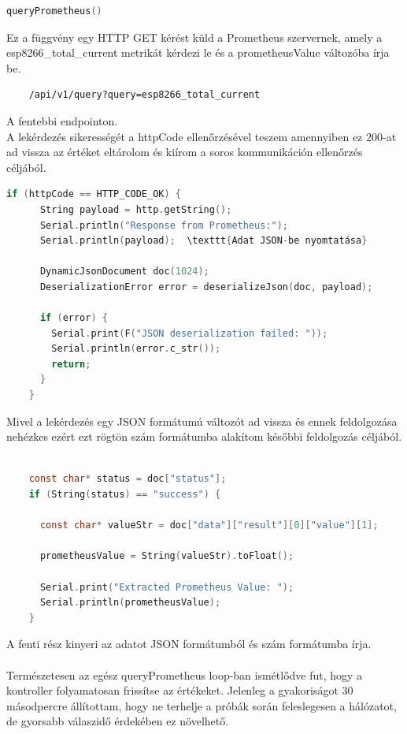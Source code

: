 \begin{lstlisting}[language=C]
    queryPrometheus()
\end{lstlisting}

Ez a függvény egy HTTP GET kérést küld a Prometheus szervernek, amely a esp8266\_total\_current 
metrikát kérdezi le és a prometheusValue változóba írja be.

\begin{lstlisting}
    /api/v1/query?query=esp8266_total_current
\end{lstlisting}

A fentebbi endpointon. \\
A lekérdezés sikerességét a httpCode ellenőrzésével teszem amennyiben ez 200-at ad vissza az értéket eltárolom 
és kiírom a soros kommunikáción ellenőrzés céljából.

\begin{lstlisting}[language=C]
    if (httpCode == HTTP_CODE_OK) {
      String payload = http.getString();
      Serial.println("Response from Prometheus:");
      Serial.println(payload);  \texttt{Adat JSON-be nyomtatása}

      DynamicJsonDocument doc(1024);
      DeserializationError error = deserializeJson(doc, payload);

      if (error) {
        Serial.print(F("JSON deserialization failed: "));
        Serial.println(error.c_str());
        return;
      }
    }
\end{lstlisting}

Mivel a lekérdezés egy JSON formátumú változót ad vissza és ennek feldolgozása nehézkes ezért ezt rögtön szám 
formátumba alakítom későbbi feldolgozás céljából.

\begin{lstlisting}[language=C]
    
    const char* status = doc["status"];
    if (String(status) == "success") {
      
      const char* valueStr = doc["data"]["result"][0]["value"][1];
      
      prometheusValue = String(valueStr).toFloat();

      Serial.print("Extracted Prometheus Value: ");
      Serial.println(prometheusValue);
    }
\end{lstlisting}

A fenti rész kinyeri az adatot JSON formátumból és szám formátumba írja.\\
\\
Természetesen az egész queryPrometheus loop-ban ismétlődve fut, hogy a kontroller folyamatosan frissítse az értékeket. 
Jelenleg a gyakoriságot 30 másodpercre állítottam, hogy ne terhelje a próbák során feleslegesen a hálózatot, 
de gyorsabb válaszidő érdekében ez növelhető.


